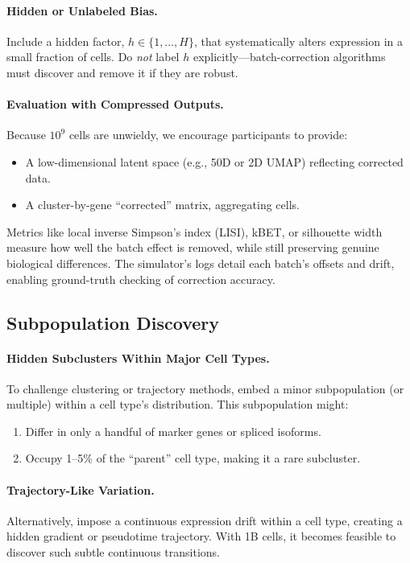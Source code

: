 \documentclass{article}
\begin{document}
\paragraph{Hidden or Unlabeled Bias.}
Include a hidden factor, $h\in\{1,\dots,H\}$, that systematically alters expression in a small fraction of cells. Do \emph{not} label $h$ explicitly---batch-correction algorithms must discover and remove it if they are robust.

\paragraph{Evaluation with Compressed Outputs.}
Because $10^9$ cells are unwieldy, we encourage participants to provide:
\begin{itemize}
	\item A low-dimensional latent space (e.g., 50D or 2D UMAP) reflecting corrected data.
	\item A cluster-by-gene “corrected” matrix, aggregating cells. 
\end{itemize}
Metrics like local inverse Simpson’s index (LISI), kBET, or silhouette width measure how well the batch effect is removed, while still preserving genuine biological differences. The simulator’s logs detail each batch’s offsets and drift, enabling ground-truth checking of correction accuracy.

\subsection{Subpopulation Discovery}
\label{sec:1B_subpop}

\paragraph{Hidden Subclusters Within Major Cell Types.}
To challenge clustering or trajectory methods, embed a minor subpopulation (or multiple) within a cell type’s distribution. This subpopulation might:
\begin{enumerate}
	\item Differ in only a handful of marker genes or spliced isoforms.
	\item Occupy 1--5\% of the “parent” cell type, making it a rare subcluster.
\end{enumerate}

\paragraph{Trajectory-Like Variation.}
Alternatively, impose a continuous expression drift within a cell type, creating a hidden gradient or pseudotime trajectory. With 1B cells, it becomes feasible to discover such subtle continuous transitions.
\end{document}
